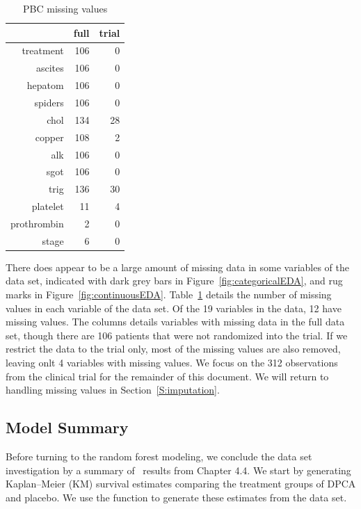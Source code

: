 \documentclass[nojss]{jss}\usepackage[]{graphicx}\usepackage[]{color}
\begin{document}
\begin{table}[ht]
\centering
{\footnotesize
\begin{tabular}{rrr}
  \toprule
 & full & trial \\ 
  \midrule
treatment &  106 &    0 \\ 
   \rowcolor[gray]{0.95}ascites &  106 &    0 \\ 
  hepatom &  106 &    0 \\ 
   \rowcolor[gray]{0.95}spiders &  106 &    0 \\ 
  chol &  134 &   28 \\ 
   \rowcolor[gray]{0.95}copper &  108 &    2 \\ 
  alk &  106 &    0 \\ 
   \rowcolor[gray]{0.95}sgot &  106 &    0 \\ 
  trig &  136 &   30 \\ 
   \rowcolor[gray]{0.95}platelet &   11 &    4 \\ 
  prothrombin &    2 &    0 \\ 
   \rowcolor[gray]{0.95}stage &    6 &    0 \\ 
   \bottomrule
\end{tabular}
}
\caption{PBC missing values} 
\label{T:missing}
\end{table}


There does appear to be a large amount of missing data in some variables of the  data set, indicated with dark grey bars in Figure~\ref{fig:categoricalEDA}, and rug marks in Figure~\ref{fig:continuousEDA}. Table~\ref{T:missing} details the number of missing values in each variable of the  data set. Of the 19 variables in the data, 12 have missing values. The  columns details variables with missing data in the full  data set, though there are 106 patients that were not randomized into the trial. If we restrict the data to the trial only, most of the missing values are also removed, leaving onlt 4 variables with missing values. We focus on the 312 observations from the clinical trial for the remainder of this document. We will return to handling missing values in Section~\ref{S:imputation}.


\subsection[PBC Model Summary]{\cite{fleming:1991} Model Summary}
Before turning to the random forest modeling, we conclude the data set investigation by a summary of~\cite{fleming:1991} results from Chapter 4.4. We start by generating Kaplan--Meier (KM) survival estimates comparing the treatment groups of DPCA and placebo. We use the   function to generate these estimates from the data set. 
\end{document}
